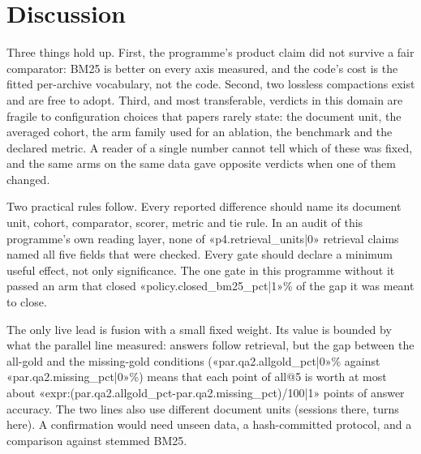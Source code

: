 \documentclass[11pt,a4paper]{article}
\begin{document}
\section{Discussion}
Three things hold up. First, the programme's product claim did not survive a fair comparator: BM25 is better on every axis measured, and the code's cost is the fitted per-archive vocabulary, not the code. Second, two lossless compactions exist and are free to adopt. Third, and most transferable, verdicts in this domain are fragile to configuration choices that papers rarely state: the document unit, the averaged cohort, the arm family used for an ablation, the benchmark and the declared metric. A reader of a single number cannot tell which of these was fixed, and the same arms on the same data gave opposite verdicts when one of them changed.

Two practical rules follow. Every reported difference should name its document unit, cohort, comparator, scorer, metric and tie rule. In an audit of this programme's own reading layer, none of «p4.retrieval_units|0» retrieval claims named all five fields that were checked. Every gate should declare a minimum useful effect, not only significance. The one gate in this programme without it passed an arm that closed «policy.closed_bm25_pct|1»\% of the gap it was meant to close.

The only live lead is fusion with a small fixed weight. Its value is bounded by what the parallel line measured: answers follow retrieval, but the gap between the all-gold and the missing-gold conditions («par.qa2.allgold_pct|0»\% against «par.qa2.missing_pct|0»\%) means that each point of all@5 is worth at most about «expr:({par.qa2.allgold_pct}-{par.qa2.missing_pct})/100|1» points of answer accuracy. The two lines also use different document units (sessions there, turns here). A confirmation would need unseen data, a hash-committed protocol, and a comparison against stemmed BM25.
\end{document}
